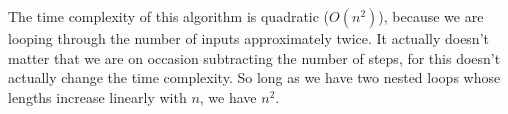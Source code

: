 \documentclass[12pt]{article}
\theoremstyle{definition}
\begin{document}
The time complexity of this algorithm is quadratic ($O(n^2)$), because we are looping through the number of inputs approximately twice. It actually doesn't matter that we are on occasion subtracting the number of steps, for this doesn't actually change the time complexity. So long as we have two nested loops whose lengths increase linearly with $n$, we have $n^2$.
\end{document}
